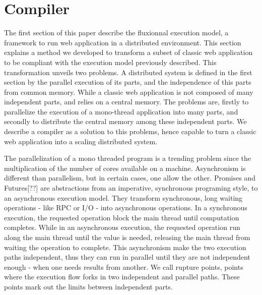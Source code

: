 \section{Compiler} \label{section:compiler}

The first section of this paper describe the fluxionnal execution model, a framework to run web application in a distributed environment.
This section explains a method we developed to transform a subset of classic web application to be compliant with the execution model previously described.
This transformation unveils two problems.
A distributed system is defined in the first section by the parallel execution of its parts, and the independence of this parts from common memory.
While a classic web application is not composed of many independent parts, and relies on a central memory.
The problems are, firstly to parallelize the execution of a mono-thread application into many parts, and secondly to distribute the central memory among these independent parts.
We describe a compiler as a solution to this problems, hence capable to turn a classic web application into a scaling distributed system. 

The parallelization of a mono threaded program is a trending problem since the multiplication of the number of cores available on a machine.
Asynchronism is different than parallelism, but in certain cases, one allow the other.
Promises\cite{Liskov1988} and Futures[??] are abstractions from an imperative, synchronous programing style, to an asynchronous execution model.
They transform synchronous, long waiting operations - like RPC or I/O - into asynchronous operations.
In a synchronous execution, the requested operation block the main thread until computation completes.
While in an asynchronous execution, the requested operation run along the main thread until the value is needed, releasing the main thread from waiting the operation to complete.
This asynchronism make the two execution paths independent, thus they can run in parallel until they are not independent enough - when one needs results from another.
We call rupture points, points where the execution flow forks in two independent and parallel paths.
These points mark out the limits between independent parts.

